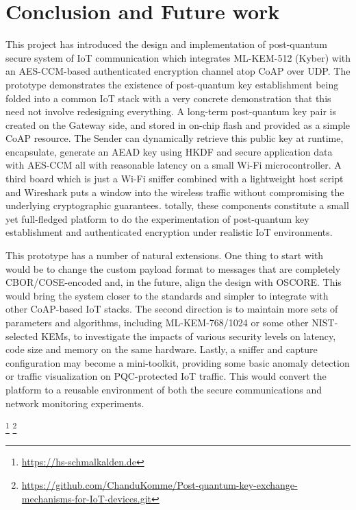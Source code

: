 \documentclass[a4paper]{scrartcl}
\begin{document}
    \section{Conclusion and Future work}
    This project has introduced the design and implementation of post-quantum secure system of IoT communication which integrates ML-KEM-512 (Kyber) with an AES-CCM-based authenticated encryption channel atop CoAP over UDP. The prototype demonstrates the existence of post-quantum key establishment being folded into a common IoT stack with a very concrete demonstration that this need not involve redesigning everything. A long-term post-quantum key pair is created on the Gateway side, and stored in on-chip flash and provided as a simple CoAP resource. The Sender can dynamically retrieve this public key at runtime, encapsulate, generate an AEAD key using HKDF and secure application data with AES-CCM all with reasonable latency on a small Wi-Fi microcontroller. A third board which is just a Wi-Fi sniffer combined with a lightweight host script and Wireshark puts a window into the wireless traffic without compromising the underlying cryptographic guarantees. totally, these components constitute a small yet full-fledged platform to do the experimentation of post-quantum key establishment and authenticated encryption under realistic IoT environments.

    This prototype has a number of natural extensions. One thing to start with would be to change the custom payload format to messages that are completely CBOR/COSE-encoded and, in the future, align the design with OSCORE. This would bring the system closer to the standards and simpler to integrate with other CoAP-based IoT stacks. The second direction is to maintain more sets of parameters and algorithms, including ML-KEM-768/1024 or some other NIST-selected KEMs, to investigate the impacts of various security levels on latency, code size and memory on the same hardware. Lastly, a sniffer and capture configuration may become a mini-toolkit, providing some basic anomaly detection or traffic visualization on PQC-protected IoT traffic. This would convert the platform to a reusable environment of both the secure communications and network monitoring experiments.

    
	
	
	\footnote{\url{https://hs-schmalkalden.de}}
	\footnote{\url{https://github.com/ChanduKomme/Post-quantum-key-exchange-mechanisms-for-IoT-devices.git}}
	
\end{document}

